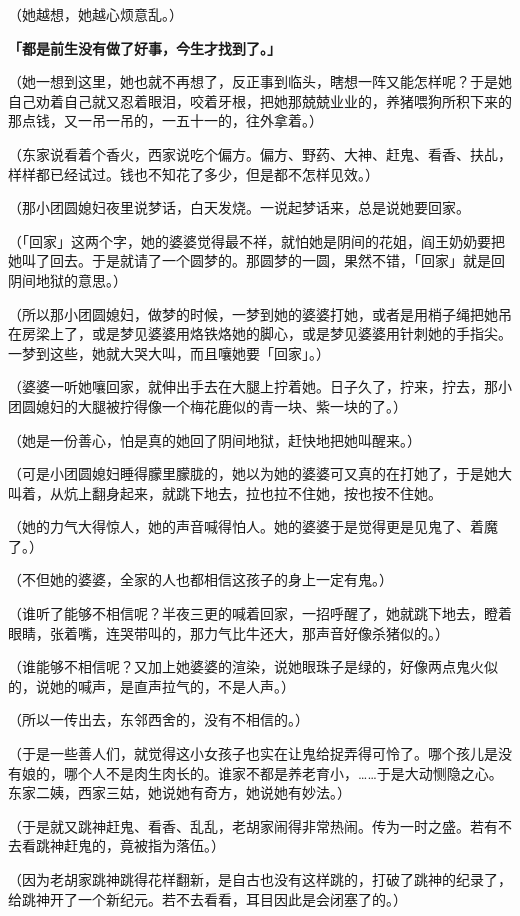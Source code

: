 \documentclass[UTF8]{ctexart}
\begin{document}
（她越想，她越心烦意乱。）

\textbf{「都是前生没有做了好事，今生才找到了。」}

（她一想到这里，她也就不再想了，反正事到临头，瞎想一阵又能怎样呢？于是她自己劝着自己就又忍着眼泪，咬着牙根，把她那兢兢业业的，养猪喂狗所积下来的那点钱，又一吊一吊的，一五十一的，往外拿着。）

（东家说看着个香火，西家说吃个偏方。偏方、野药、大神、赶鬼、看香、扶乩，样样都已经试过。钱也不知花了多少，但是都不怎样见效。）

（那小团圆媳妇夜里说梦话，白天发烧。一说起梦话来，总是说她要回家。

（「回家」这两个字，她的婆婆觉得最不祥，就怕她是阴间的花姐，阎王奶奶要把她叫了回去。于是就请了一个圆梦的。那圆梦的一圆，果然不错，「回家」就是回阴间地狱的意思。）

（所以那小团圆媳妇，做梦的时候，一梦到她的婆婆打她，或者是用梢子绳把她吊在房梁上了，或是梦见婆婆用烙铁烙她的脚心，或是梦见婆婆用针刺她的手指尖。一梦到这些，她就大哭大叫，而且嚷她要「回家」。）

（婆婆一听她嚷回家，就伸出手去在大腿上拧着她。日子久了，拧来，拧去，那小团圆媳妇的大腿被拧得像一个梅花鹿似的青一块、紫一块的了。）

（她是一份善心，怕是真的她回了阴间地狱，赶快地把她叫醒来。）

（可是小团圆媳妇睡得朦里朦胧的，她以为她的婆婆可又真的在打她了，于是她大叫着，从炕上翻身起来，就跳下地去，拉也拉不住她，按也按不住她。

（她的力气大得惊人，她的声音喊得怕人。她的婆婆于是觉得更是见鬼了、着魔了。）

（不但她的婆婆，全家的人也都相信这孩子的身上一定有鬼。）

（谁听了能够不相信呢？半夜三更的喊着回家，一招呼醒了，她就跳下地去，瞪着眼睛，张着嘴，连哭带叫的，那力气比牛还大，那声音好像杀猪似的。）

（谁能够不相信呢？又加上她婆婆的渲染，说她眼珠子是绿的，好像两点鬼火似的，说她的喊声，是直声拉气的，不是人声。）

（所以一传出去，东邻西舍的，没有不相信的。）

（于是一些善人们，就觉得这小女孩子也实在让鬼给捉弄得可怜了。哪个孩儿是没有娘的，哪个人不是肉生肉长的。谁家不都是养老育小，……于是大动恻隐之心。东家二姨，西家三姑，她说她有奇方，她说她有妙法。）

（于是就又跳神赶鬼、看香、乱乱，老胡家闹得非常热闹。传为一时之盛。若有不去看跳神赶鬼的，竟被指为落伍。）

（因为老胡家跳神跳得花样翻新，是自古也没有这样跳的，打破了跳神的纪录了，给跳神开了一个新纪元。若不去看看，耳目因此是会闭塞了的。）
\end{document}
